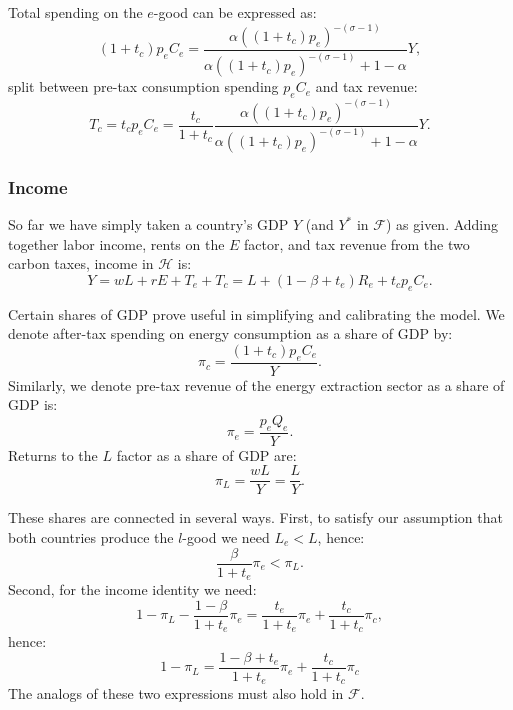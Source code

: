 \documentclass[notitlepage,12pt]{article}
\begin{document}
Total spending on the $e$-good can be expressed as:%
\begin{equation}
(1+t_{c})p_{e}C_{e}=\frac{\alpha \left( (1+t_{c})p_{e}\right) ^{-(\sigma -1)}%
}{\alpha \left( (1+t_{c})p_{e}\right) ^{-(\sigma -1)}+1-\alpha }Y,
\label{e consumption}
\end{equation}%
split between pre-tax consumption spending $p_{e}C_{e}$ and tax revenue:%
\begin{equation*}
T_{c}=t_{c}p_{e}C_{e}=\frac{t_{c}}{1+t_{c}}\frac{\alpha \left(
(1+t_{c})p_{e}\right) ^{-(\sigma -1)}}{\alpha \left( (1+t_{c})p_{e}\right)
^{-(\sigma -1)}+1-\alpha }Y.
\end{equation*}

\subsubsection{Income}

So far we have simply taken a country's GDP $Y$ (and $Y^{\ast }$ in $%
\mathcal{F}$) as given. Adding together labor income, rents on the $E$
factor, and tax revenue from the two carbon taxes, income in $\mathcal{H}$
is:%
\begin{equation*}
Y=wL+rE+T_{e}+T_{c}=L+\left( 1-\beta +t_{e}\right) R_{e}+t_{c}p_{e}C_{e}.
\end{equation*}

Certain shares of GDP prove useful in simplifying and calibrating the model.
We denote after-tax spending on energy consumption as a share of GDP by:%
\begin{equation*}
\pi _{c}=\frac{\left( 1+t_{c}\right) p_{e}C_{e}}{Y}.
\end{equation*}%
Similarly, we denote pre-tax revenue of the energy extraction sector as a
share of GDP is:%
\begin{equation*}
\pi _{e}=\frac{p_{e}Q_{e}}{Y}.
\end{equation*}%
Returns to the $L$ factor as a share of GDP are:%
\begin{equation*}
\pi _{L}=\frac{wL}{Y}=\frac{L}{Y}.
\end{equation*}

These shares are connected in several ways. First, to satisfy our assumption
that both countries produce the $l$-good we need $L_{e}<L$, hence:%
\begin{equation*}
\frac{\beta }{1+t_{e}}\pi _{e}<\pi _{L}.
\end{equation*}%
Second, for the income identity we need:%
\begin{equation*}
1-\pi _{L}-\frac{1-\beta }{1+t_{e}}\pi _{e}=\frac{t_{e}}{1+t_{e}}\pi _{e}+%
\frac{t_{c}}{1+t_{c}}\pi _{c},
\end{equation*}%
hence:%
\begin{equation*}
1-\pi _{L}=\frac{1-\beta +t_{e}}{1+t_{e}}\pi _{e}+\frac{t_{c}}{1+t_{c}}\pi
_{c}
\end{equation*}%
The analogs of these two expressions must also hold in $\mathcal{F}$.
\end{document}
